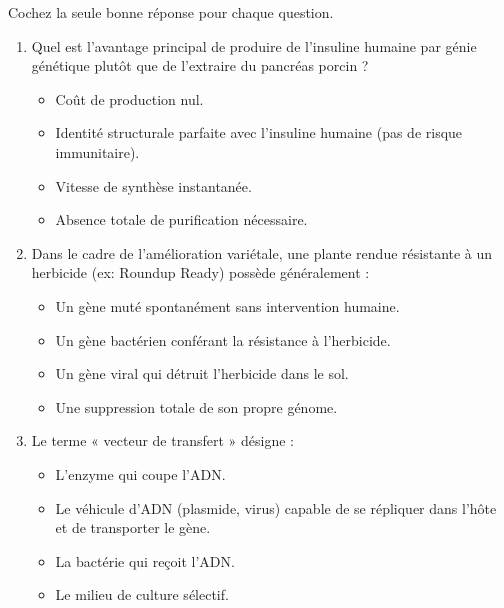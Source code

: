 \documentclass[11pt]{article}
\begin{document}
\begin{exercice}
Cochez la seule bonne réponse pour chaque question.
\begin{enumerate}
    \item Quel est l'avantage principal de produire de l'insuline humaine par génie génétique plutôt que de l'extraire du pancréas porcin ?
    \begin{itemize}
        \item[A] Coût de production nul.
        \item[B] Identité structurale parfaite avec l'insuline humaine (pas de risque immunitaire).
        \item[C] Vitesse de synthèse instantanée.
        \item[D] Absence totale de purification nécessaire.
    \end{itemize}
    \item Dans le cadre de l'amélioration variétale, une plante rendue résistante à un herbicide (ex: Roundup Ready) possède généralement :
    \begin{itemize}
        \item[A] Un gène muté spontanément sans intervention humaine.
        \item[B] Un gène bactérien conférant la résistance à l'herbicide.
        \item[C] Un gène viral qui détruit l'herbicide dans le sol.
        \item[D] Une suppression totale de son propre génome.
    \end{itemize}
    \item Le terme « vecteur de transfert » désigne :
    \begin{itemize}
        \item[A] L'enzyme qui coupe l'ADN.
        \item[B] Le véhicule d'ADN (plasmide, virus) capable de se répliquer dans l'hôte et de transporter le gène.
        \item[C] La bactérie qui reçoit l'ADN.
        \item[D] Le milieu de culture sélectif.
    \end{itemize}
\end{enumerate}
\end{exercice}
\end{document}
